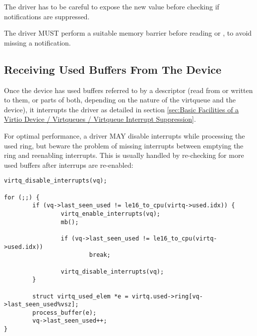 The driver has to be careful to expose the new 
value before checking if notifications are suppressed.

The driver MUST perform a suitable memory barrier before reading  or
, to avoid missing a notification.

\subsection{Receiving Used Buffers From The Device}\label{sec:General Initialization And Device Operation / Device Operation / Receiving Used Buffers From The Device}

Once the device has used buffers referred to by a descriptor (read from or written to them, or
parts of both, depending on the nature of the virtqueue and the
device), it interrupts the driver as detailed in section \ref{sec:Basic Facilities of a Virtio Device / Virtqueues / Virtqueue Interrupt Suppression}.

\begin{note}
For optimal performance, a driver MAY disable interrupts while processing
the used ring, but beware the problem of missing interrupts between
emptying the ring and reenabling interrupts.  This is usually handled by
re-checking for more used buffers after interrups are re-enabled:

\begin{lstlisting}
virtq_disable_interrupts(vq);

for (;;) {
        if (vq->last_seen_used != le16_to_cpu(virtq->used.idx)) {
                virtq_enable_interrupts(vq);
                mb();

                if (vq->last_seen_used != le16_to_cpu(virtq->used.idx))
                        break;

                virtq_disable_interrupts(vq);
        }

        struct virtq_used_elem *e = virtq.used->ring[vq->last_seen_used%vsz];
        process_buffer(e);
        vq->last_seen_used++;
}
\end{lstlisting}
\end{note}

